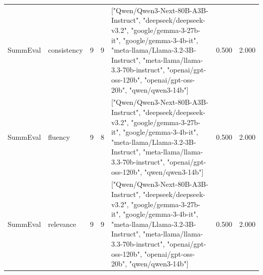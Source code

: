 \begin{tabular}{llrrlrr}
SummEval & consistency & 9 & 9 & ["Qwen/Qwen3-Next-80B-A3B-Instruct", "deepseek/deepseek-v3.2", "google/gemma-3-27b-it", "google/gemma-3-4b-it", "meta-llama/Llama-3.2-3B-Instruct", "meta-llama/llama-3.3-70b-instruct", "openai/gpt-oss-120b", "openai/gpt-oss-20b", "qwen/qwen3-14b"] & 0.500 & 2.000 \\
SummEval & fluency & 9 & 8 & ["Qwen/Qwen3-Next-80B-A3B-Instruct", "deepseek/deepseek-v3.2", "google/gemma-3-27b-it", "google/gemma-3-4b-it", "meta-llama/Llama-3.2-3B-Instruct", "meta-llama/llama-3.3-70b-instruct", "openai/gpt-oss-120b", "qwen/qwen3-14b"] & 0.500 & 2.000 \\
SummEval & relevance & 9 & 9 & ["Qwen/Qwen3-Next-80B-A3B-Instruct", "deepseek/deepseek-v3.2", "google/gemma-3-27b-it", "google/gemma-3-4b-it", "meta-llama/Llama-3.2-3B-Instruct", "meta-llama/llama-3.3-70b-instruct", "openai/gpt-oss-120b", "openai/gpt-oss-20b", "qwen/qwen3-14b"] & 0.500 & 2.000 \\
\bottomrule
\end{tabular}
